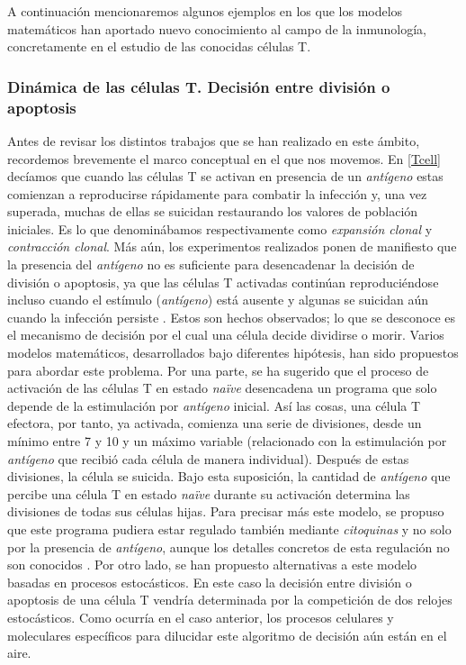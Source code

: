 A continuación mencionaremos algunos ejemplos en los que los modelos matemáticos han aportado nuevo conocimiento al campo de la inmunología, concretamente en el estudio de las conocidas células T. 


\subsubsection{Dinámica de las células T. Decisión entre división o apoptosis}
\label{cuestionAmodelizar}

Antes de revisar los distintos trabajos que se han realizado en este ámbito, recordemos brevemente el marco conceptual en el que nos movemos. En \ref{Tcell} decíamos que cuando las células T se activan en presencia de un \textit{antígeno} estas comienzan a reproducirse rápidamente para combatir la infección y, una vez superada, muchas de ellas se suicidan restaurando los valores de población iniciales. Es lo que denominábamos respectivamente como \textit{expansión clonal} y \textit{contracción clonal}. Más aún, los experimentos realizados ponen de manifiesto que la presencia del \textit{antígeno} no es suficiente para desencadenar la decisión de división o apoptosis, ya que las células T activadas continúan reproduciéndose incluso cuando el estímulo (\textit{antígeno}) está ausente y algunas se suicidan aún cuando la infección persiste \citep{JTB}. Estos son hechos observados; lo que se desconoce es el mecanismo de decisión por el cual una célula decide dividirse o morir. Varios modelos matemáticos, desarrollados bajo diferentes hipótesis, han sido propuestos para abordar este problema. Por una parte, se ha sugerido que el proceso de activación de las células T en estado \textit{naïve} desencadena un programa que solo depende de la estimulación por \textit{antígeno} inicial. Así las cosas, una célula T efectora, por tanto, ya activada, comienza una serie de divisiones, desde un mínimo entre 7 y 10 y un máximo variable (relacionado con la estimulación por \textit{antígeno} que recibió cada célula de manera individual). Después de estas divisiones, la célula se suicida. Bajo esta suposición, la cantidad de \textit{antígeno} que percibe una célula T en estado \textit{naïve} durante su activación determina las divisiones de todas sus células hijas. Para precisar más este modelo, se propuso que este programa pudiera estar regulado también mediante \textit{citoquinas} y no solo por la presencia de \textit{antígeno}, aunque los detalles concretos de esta regulación no son conocidos \citep{JTB}. Por otro lado, se han propuesto alternativas a este modelo basadas en procesos estocásticos. En este caso la decisión entre división o apoptosis de una célula T vendría determinada por la competición de dos relojes estocásticos. Como ocurría en el caso anterior, los procesos celulares y moleculares específicos para dilucidar este algoritmo de decisión aún están en el aire. 

